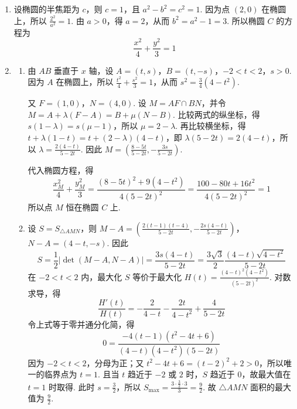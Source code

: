 \begin{solution}
\begin{enumerate}
\item 设椭圆的半焦距为 \(c\)，则 \(c=1\)，且 \(a^2-b^2=c^2=1\). 因为点 \((2,0)\) 在椭圆上，所以 \(\frac{2^2}{a^2}=1\). 由 \(a>0\)，得 \(a=2\)，从而 \(b^2=a^2-1=3\). 所以椭圆 \(C\) 的方程为
\[
\frac{x^2}{4}+\frac{y^2}{3}=1
\]
\item
\begin{enumerate}
\item 由 \(AB\) 垂直于 \(x\) 轴，设 \(A=(t,s)\)，\(B=(t,-s)\)，\(-2<t<2\)，\(s>0\). 因为 \(A\) 在椭圆上，所以 \(\frac{t^2}{4}+\frac{s^2}{3}=1\)，从而 \(s^2=\frac{3}{4}\left(4-t^2\right)\).

又 \(F=(1,0)\)，\(N=(4,0)\). 设 \(M=AF\cap BN\)，并令 \(M=A+\lambda(F-A)=B+\mu(N-B)\). 比较两式的纵坐标，得 \(s(1-\lambda)=s(\mu-1)\)，所以 \(\mu=2-\lambda\). 再比较横坐标，得 \(t+\lambda(1-t)=t+(2-\lambda)(4-t)\)，即 \(\lambda(5-2t)=2(4-t)\)，所以 \(\lambda=\frac{2(4-t)}{5-2t}\). 因此 \(M=\left(\frac{8-5t}{5-2t},-\frac{3s}{5-2t}\right)\).

代入椭圆方程，得
\[
\frac{x_M^2}{4}+\frac{y_M^2}{3}=\frac{(8-5t)^2+9(4-t^2)}{4(5-2t)^2}=\frac{100-80t+16t^2}{4(5-2t)^2}=1
\]
所以点 \(M\) 恒在椭圆 \(C\) 上.

\item 设 \(S=S_{\triangle AMN}\)，则 \(M-A=\left(\frac{2(t-1)(t-4)}{5-2t},-\frac{2s(4-t)}{5-2t}\right)\)，\(N-A=(4-t,-s)\). 因此
\[
S=\frac{1}{2}\left|\det(M-A,N-A)\right|=\frac{3s(4-t)}{5-2t}=\frac{3\sqrt{3}}{2}\frac{(4-t)\sqrt{4-t^2}}{5-2t}
\]
在 \(-2<t<2\) 内，最大化 \(S\) 等价于最大化 \(H(t)=\frac{(4-t)^2(4-t^2)}{(5-2t)^2}\). 对数求导，得
\[
\frac{H'(t)}{H(t)}=-\frac{2}{4-t}-\frac{2t}{4-t^2}+\frac{4}{5-2t}
\]
令上式等于零并通分化简，得
\[
0=\frac{-4(t-1)(t^2-4t+6)}{(4-t)(4-t^2)(5-2t)}
\]
因为 \(-2<t<2\)，分母为正；又 \(t^2-4t+6=(t-2)^2+2>0\)，所以唯一的临界点为 \(t=1\). 且当 \(t\) 趋近于 \(-2\) 或 \(2\) 时，\(S\) 趋近于 \(0\)，故最大值在 \(t=1\) 时取得. 此时 \(s=\frac{3}{2}\)，所以 \(S_{\max}=\frac{3\cdot\frac{3}{2}\cdot3}{3}=\frac{9}{2}\). 故 \(\triangle AMN\) 面积的最大值为 \(\frac{9}{2}\).
\end{enumerate}
\end{enumerate}
\end{solution}
